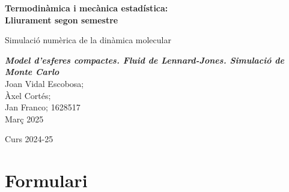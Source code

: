 \documentclass[9pt]{article}
\begin{document}
	
	\begin{titlepage}
		\begin{center}
			\vspace*{1cm}
			
			\Huge
			\textbf{Termodinàmica i mecànica estadística:\\
			Lliurament segon semestre}
			
			\vspace{0.5cm}
			\Huge
			Simulació numèrica de la dinàmica molecular
			
			\vspace{1.5cm}
			\Large    
			\textbf{\textit{Model d'esferes compactes. Fluid de Lennard-Jones. Simulació de Monte Carlo}} \\
			Joan Vidal Escobosa;\\ Àxel Cortés; \\Jan Franco; 1628517 \\ 
			
			
			\vfill
			\LARGE
			Març 2025
			
			\vspace{0.8cm}
			
			\Large
			Curs 2024-25 
		\end{center} 
	\end{titlepage}
	
	
	
	
	
	
\setcounter{page}{1}
\section{Formulari}
\end{document}
